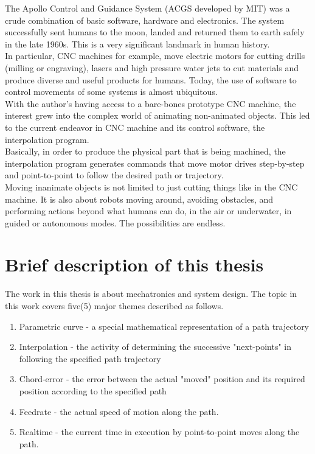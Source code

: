 The Apollo Control and Guidance System (ACGS developed by MIT) was a crude combination of basic software, hardware and electronics. The system successfully sent humans to the moon, landed and returned them to earth safely in the late 1960s. This is a very significant landmark in human history.\\ 

In particular, CNC machines for example, move electric motors for cutting drills (milling or engraving), lasers and high pressure water jets to cut materials and produce diverse and useful products for humans. Today, the use of software to control movements of some systems is almost ubiquitous.\\ 

With the author's having access to a bare-bones prototype CNC machine, the interest grew into the complex world of animating non-animated objects. This led to the current endeavor in CNC machine and its control software, the interpolation program. \\

Basically, in order to produce the physical part that is being machined, the interpolation program generates commands that move motor drives step-by-step and point-to-point to follow the desired path or trajectory. \\

Moving inanimate objects is not limited to just cutting things like in the CNC machine. It is also about robots moving around, avoiding obstacles, and performing actions beyond what humans can do, in the air or underwater, in guided or autonomous modes. The possibilities are endless.

\section{Brief description of this thesis}   

\noindent 
The work in this thesis is about mechatronics and system design. The topic in this work covers five(5) major themes described as follows.

\begin{enumerate}
	\item Parametric curve - a special mathematical representation of a path trajectory 
	
	\item Interpolation - the activity of determining the successive "next-points" in following the specified path trajectory
	
	\item Chord-error - the error between the actual "moved" position and its required position according to the specified path
	
	\item Feedrate - the actual speed of motion along the path.
	
	\item Realtime - the current time in execution by point-to-point moves along the path.
	
\end{enumerate}

